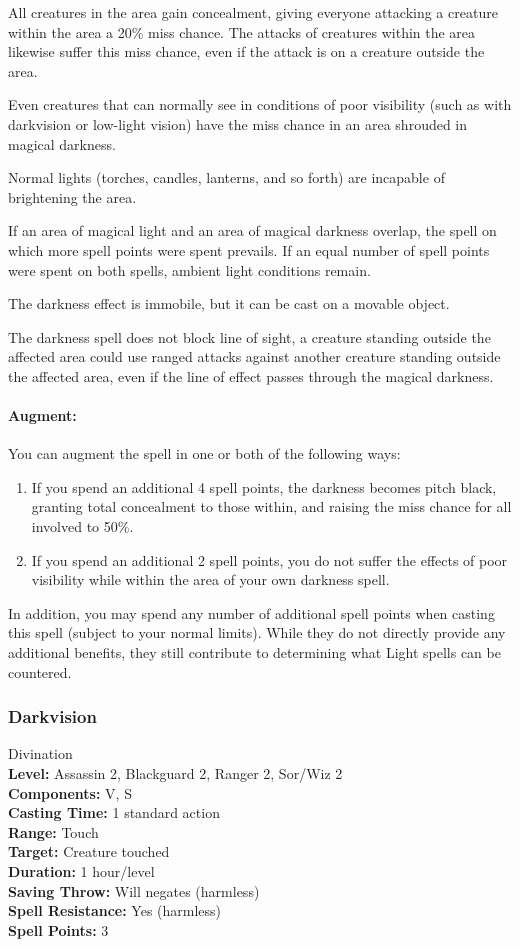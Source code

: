 All creatures in the area gain concealment, giving everyone attacking a creature within the area a 20\% miss chance.
The attacks of creatures within the area likewise suffer this miss chance, even if the attack is on a creature outside the area.

Even creatures that can normally see in conditions of poor visibility
(such as with darkvision or low-light vision) have the miss chance in an area shrouded in magical darkness.

Normal lights (torches, candles, lanterns, and so forth) are incapable of brightening the area.

If an area of magical light and an area of magical darkness overlap, 
the spell on which more spell points were spent prevails.
If an equal number of spell points were spent on both spells, ambient light conditions remain.

The darkness effect is immobile, but it can be cast on a movable object. 

The darkness spell does not block line of sight, a creature standing outside the affected area could use ranged attacks against another creature standing
outside the affected area, even if the line of effect passes through the magical darkness.

\paragraph{Augment:} You can augment the spell in one or both of the following ways:
\begin{enumerate}
 \item If you spend an additional 4 spell points, the darkness becomes pitch black, 
 granting total concealment to those within, and raising the miss chance for all involved to 50\%.
 \item If you spend an additional 2 spell points, 
you do not suffer the effects of poor visibility while within the area of your own darkness spell.
\end{enumerate}
In addition, you may spend any number of additional spell points when casting this spell (subject to your normal limits). 
While they do not directly provide any additional benefits, they still contribute to determining what Light spells can be countered.
\subsubsection{Darkvision}
\label{Spell:Darkvision}
Divination
\\ \textbf{Level:} Assassin 2, Blackguard 2, Ranger 2, Sor/Wiz 2
\\ \textbf{Components:} V, S
\\ \textbf{Casting Time:} 1 standard action
\\ \textbf{Range:} Touch
\\ \textbf{Target:} Creature touched
\\ \textbf{Duration:} 1 hour/level
\\ \textbf{Saving Throw:} Will negates (harmless)
\\ \textbf{Spell Resistance:} Yes (harmless)
\\ \textbf{Spell Points:} 3

